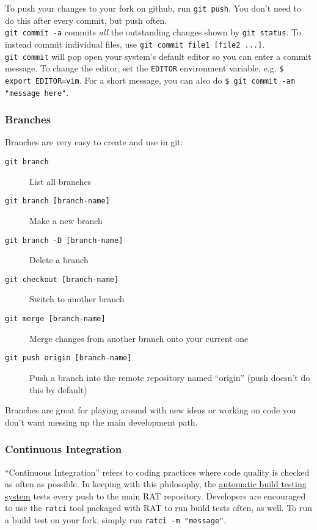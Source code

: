 \documentclass{article}
\begin{document}
To push your changes to your fork on github, run {\tt git push}. You don't need to do this after every commit, but push often.\\

{\tt git commit -a} commits {\it all} the outstanding changes shown by {\tt git status}. To instead commit individual files, use {\tt git commit file1 [file2 ...]}.\\

{\tt git commit} will pop open your system's default editor so you can enter a commit message. To change the editor, set the {\tt EDITOR} environment variable, e.g. {\tt \$ export EDITOR=vim}. For a short message, you can also do {\tt \$ git commit -am "message here"}.

\subsubsection{Branches}
Branches are very easy to create and use in git:
\begin{description}
\item[{\tt git branch}] List all branches
\item[{\tt git branch [branch-name]}] Make a new branch
\item[{\tt git branch -D [branch-name]}] Delete a branch
\item[{\tt git checkout [branch-name]}] Switch to another branch
\item[{\tt git merge [branch-name]}] Merge changes from another branch onto your current one
\item[{\tt git push origin [branch-name]}] Push a branch into the remote repository named ``origin'' (push doesn't do this by default)
\end{description}
Branches are great for playing around with new ideas or working on code you don't want messing up the main development path.

\subsubsection{Continuous Integration}
``Continuous Integration'' refers to coding practices where code quality is checked as often as possible. In keeping with this philosophy, the \href{http://ratbuild.hep.upenn.edu/snoplus/build}{automatic build testing system} tests every push to the main RAT repository. Developers are encouraged to use the {\tt ratci} tool packaged with RAT to run build tests often, as well. To run a build test on your fork, simply run {\tt ratci -m "message"}.
\end{document}
